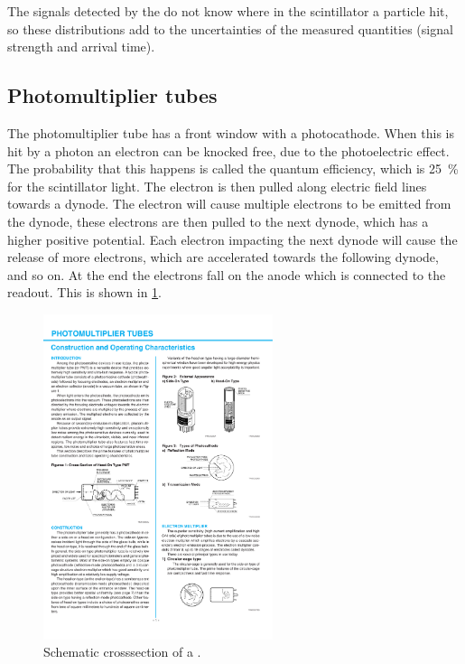 The signals detected by the \pmt do not know where in the scintillator a particle hit, so these distributions add to the uncertainties of the measured quantities (signal strength and arrival time).


\subsection{Photomultiplier tubes}

The photomultiplier tube has a front window with a photocathode. When this is hit by a photon an electron can be knocked free, due to the photoelectric effect. The probability that this happens is called the quantum efficiency, which is \SI{25}{\percent} for the scintillator light. The electron is then pulled along electric field lines towards a dynode. The electron will cause multiple electrons to be emitted from the dynode, these electrons are then pulled to the next dynode, which has a higher positive potential. Each electron impacting the next dynode will cause the release of more electrons, which are accelerated towards the following dynode, and so on. At the end the electrons fall on the anode which is connected to the readout. This is shown in \cref{fig:pmt_schematic}.

\begin{figure}
    \centering
    \includegraphics[width=0.6\textwidth]
                    {plots/station/pmt_schematic}
    \caption{Schematic crosssection of a \pmt.}
    \label{fig:pmt_schematic}
\end{figure}

